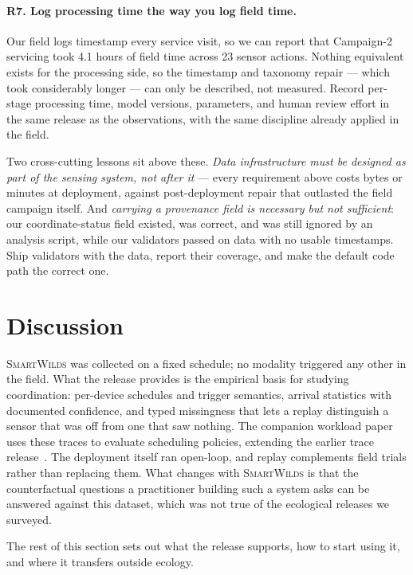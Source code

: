 \documentclass[sigconf]{acmart}
\newcommand{\smartwilds}{\textsc{SmartWilds}\xspace}
\begin{document}
\paragraph{R7. Log processing time the way you log field time.}
Our field logs timestamp every service visit, so we can report that
Campaign-2 servicing took 4.1 hours of field time across 23 sensor
actions. Nothing equivalent exists for the processing side, so the
timestamp and taxonomy repair --- which took considerably longer --- can
only be described, not measured. Record per-stage processing time, model
versions, parameters, and human review effort in the same release as the
observations, with the same discipline already applied in the field.

Two cross-cutting lessons sit above these. \emph{Data infrastructure
must be designed as part of the sensing system, not after it} --- every
requirement above costs bytes or minutes at deployment, against
post-deployment repair that outlasted the field campaign itself. And \emph{carrying a provenance field is necessary but not
sufficient}: our coordinate-status field existed, was correct, and was
still ignored by an analysis script, while our validators passed on data
with no usable timestamps. Ship validators with the data, report their
coverage, and make the default code path the correct one.

\section{Discussion}
\label{sec:discussion}
\label{sec:using}

\smartwilds was collected on a fixed schedule; no modality triggered any
other in the field. What the release provides is the empirical basis for
studying coordination: per-device schedules and trigger semantics,
arrival statistics with documented confidence, and typed missingness
that lets a replay distinguish a sensor that was off from one that saw
nothing. The companion workload paper~\cite{smartwilds_workload} uses
these traces to evaluate scheduling policies, extending the earlier
trace release~\cite{kline2025smartwilds}. The deployment itself ran
open-loop, and replay complements field trials rather than replacing
them. What changes with \smartwilds is that the counterfactual questions
a practitioner building such a system asks can be answered against this
dataset, which was not true of the ecological releases we surveyed.

The rest of this section sets out what the release supports, how to
start using it, and where it transfers outside ecology.
\end{document}
